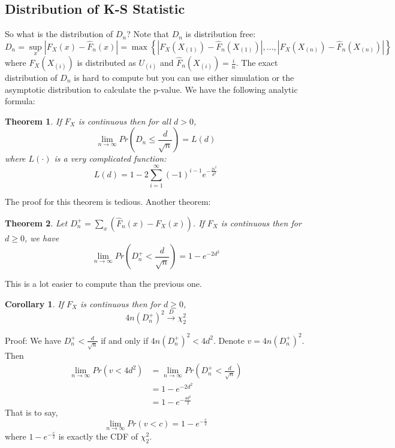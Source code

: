 \documentclass[twoside]{article}
\newtheorem*{theorem*}{Theorem}
\newtheorem*{corollary*}{Corollary}
\begin{document}
\subsection{Distribution of K-S Statistic}
So what is the distribution of $D_n$? Note that $D_n$ is distribution free: 
$$
D_n = \sup_{x} |F_X(x) - \hat{F}_n (x)| = \max \left\{ |F_X \left( X_{(1)} \right) - \hat{F}_n \left(X_{(1)} \right) |, ..., |F_X \left( X_{(n)} \right) - \hat{F}_n \left(X_{(n)} \right) | \right \}
$$
where $F_X \left( X_{(i)} \right)$ is distributed as $U_{(i)}$ and $\hat{F}_n \left( X_{(i)} \right) = \frac{i}{n}$. The exact distribution of $D_n$ is hard to compute but you can use either simulation or the asymptotic distribution to calculate the p-value. We have the following analytic formula:
\begin{theorem*}
	If $F_X$ is continuous then for all $d>0$, 
	$$
	\lim_{n \to \infty} Pr \left( D_n \leqslant \frac{d}{\sqrt{n}} \right) = L(d)
	$$
	where $L(\cdot)$ is a very complicated function:
	$$
	L(d) = 1 - 2 \sum_{i=1}^{\infty} (-1)^{i-1} e^{- \frac{2 i^2}{d^2}}
	$$
\end{theorem*}
The proof for this theorem is tedious. Another theorem: 
\begin{theorem*}
	Let $D_n^+ = \sum_{x} \left( \hat{F}_n(x) - F_X(x) \right)$. If $F_X$ is continuous then for $d \geqslant 0$, we have
	$$
	\lim_{n \to \infty} Pr \left( D_n^+ < \frac{d}{\sqrt{n}} \right) = 1 - e^{- 2 d^2}
	$$
\end{theorem*}
This is a lot easier to compute than the previous one. 
\begin{corollary*}
	If $F_X$ is continuous then for $d \geqslant 0$, 
	$$
	4n(D_n^+)^2 \xrightarrow{D} \chi_2^2
	$$
\end{corollary*}
Proof: We have $D_n^+ < \frac{d}{\sqrt{n}}$ if and only if $4n(D_n^+)^2 < 4d^2$. Denote $v = 4n(D_n^+)^2$. Then
\begin{align*}
	\lim_{n \to \infty} Pr \left( v < 4d^2 \right) &= \lim_{n \to \infty} Pr \left( D_n^+ < \frac{d}{\sqrt{n}} \right) \\
	&= 1 - e^{- 2 d^2} \\
	&= 1 - e^{- \frac{4 d^2}{2}}
\end{align*}
That is to say, 
$$
\lim_{n \to \infty} Pr \left( v < c \right) = 1 - e^{- \frac{c}{2}}
$$
where $1 - e^{- \frac{c}{2}}$ is exactly the CDF of $\chi_2^2$. 
\end{document}
